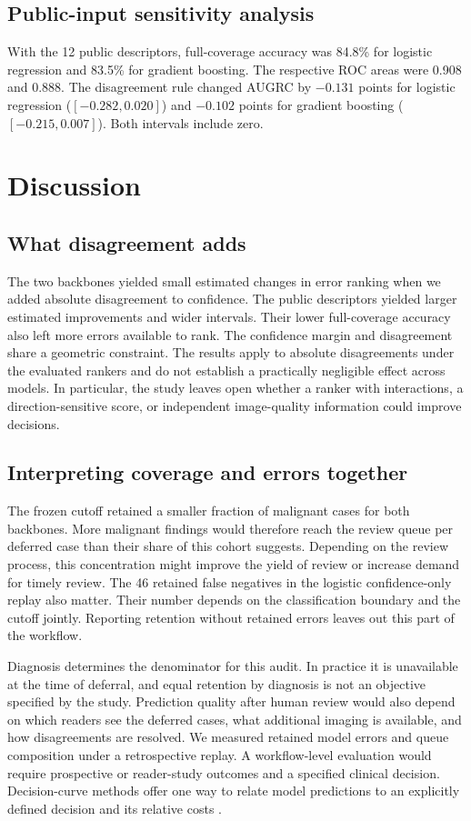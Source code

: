 \documentclass[11pt]{article}
\begin{document}
\subsection{Public-input sensitivity analysis}
With the 12 public descriptors, full-coverage accuracy was 84.8\% for logistic regression and 83.5\% for gradient boosting. The respective ROC areas were 0.908 and 0.888. The disagreement rule changed AUGRC by $-0.131$ points for logistic regression ($[-0.282,0.020]$) and $-0.102$ points for gradient boosting ($[-0.215,0.007]$). Both intervals include zero.

\section{Discussion}
\subsection{What disagreement adds}
The two backbones yielded small estimated changes in error ranking when we added absolute disagreement to confidence. The public descriptors yielded larger estimated improvements and wider intervals. Their lower full-coverage accuracy also left more errors available to rank. The confidence margin and disagreement share a geometric constraint. The results apply to absolute disagreements under the evaluated rankers and do not establish a practically negligible effect across models. In particular, the study leaves open whether a ranker with interactions, a direction-sensitive score, or independent image-quality information could improve decisions.

\subsection{Interpreting coverage and errors together}
The frozen cutoff retained a smaller fraction of malignant cases for both backbones. More malignant findings would therefore reach the review queue per deferred case than their share of this cohort suggests. Depending on the review process, this concentration might improve the yield of review or increase demand for timely review. The 46 retained false negatives in the logistic confidence-only replay also matter. Their number depends on the classification boundary and the cutoff jointly. Reporting retention without retained errors leaves out this part of the workflow.

Diagnosis determines the denominator for this audit. In practice it is unavailable at the time of deferral, and equal retention by diagnosis is not an objective specified by the study. Prediction quality after human review would also depend on which readers see the deferred cases, what additional imaging is available, and how disagreements are resolved. We measured retained model errors and queue composition under a retrospective replay. A workflow-level evaluation would require prospective or reader-study outcomes and a specified clinical decision. Decision-curve methods offer one way to relate model predictions to an explicitly defined decision and its relative costs \cite{vickers}.
\end{document}
